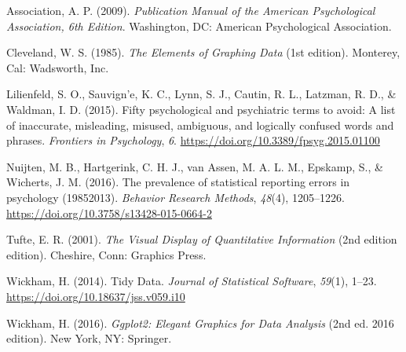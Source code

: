 \documentclass[
]{article}
\newlength{\cslhangindent}
\newenvironment{cslreferences}%
  {\setlength{\parindent}{0pt}%
  \everypar{\setlength{\hangindent}{\cslhangindent}}\ignorespaces}%
  {\par}
\begin{document}
\hypertarget{refs}{}
\begin{cslreferences}
\leavevmode\hypertarget{ref-associationPublicationManualAmerican2009}{}%
Association, A. P. (2009). \emph{Publication Manual of the American Psychological Association, 6th Edition}. Washington, DC: American Psychological Association.

\leavevmode\hypertarget{ref-clevelandElementsGraphingData1985}{}%
Cleveland, W. S. (1985). \emph{The Elements of Graphing Data} (1st edition). Monterey, Cal: Wadsworth, Inc.

\leavevmode\hypertarget{ref-lilienfeldFiftyPsychologicalPsychiatric2015}{}%
Lilienfeld, S. O., Sauvign\a'e, K. C., Lynn, S. J., Cautin, R. L., Latzman, R. D., \& Waldman, I. D. (2015). Fifty psychological and psychiatric terms to avoid: A list of inaccurate, misleading, misused, ambiguous, and logically confused words and phrases. \emph{Frontiers in Psychology}, \emph{6}. \url{https://doi.org/10.3389/fpsyg.2015.01100}

\leavevmode\hypertarget{ref-nuijtenPrevalenceStatisticalReporting2016}{}%
Nuijten, M. B., Hartgerink, C. H. J., van Assen, M. A. L. M., Epskamp, S., \& Wicherts, J. M. (2016). The prevalence of statistical reporting errors in psychology (19852013). \emph{Behavior Research Methods}, \emph{48}(4), 1205--1226. \url{https://doi.org/10.3758/s13428-015-0664-2}

\leavevmode\hypertarget{ref-tufteVisualDisplayQuantitative2001}{}%
Tufte, E. R. (2001). \emph{The Visual Display of Quantitative Information} (2nd edition edition). Cheshire, Conn: Graphics Press.

\leavevmode\hypertarget{ref-wickhamTidyData2014}{}%
Wickham, H. (2014). Tidy Data. \emph{Journal of Statistical Software}, \emph{59}(1), 1--23. \url{https://doi.org/10.18637/jss.v059.i10}

\leavevmode\hypertarget{ref-wickhamGgplot2ElegantGraphics2016}{}%
Wickham, H. (2016). \emph{Ggplot2: Elegant Graphics for Data Analysis} (2nd ed. 2016 edition). New York, NY: Springer.
\end{cslreferences}
\end{document}
